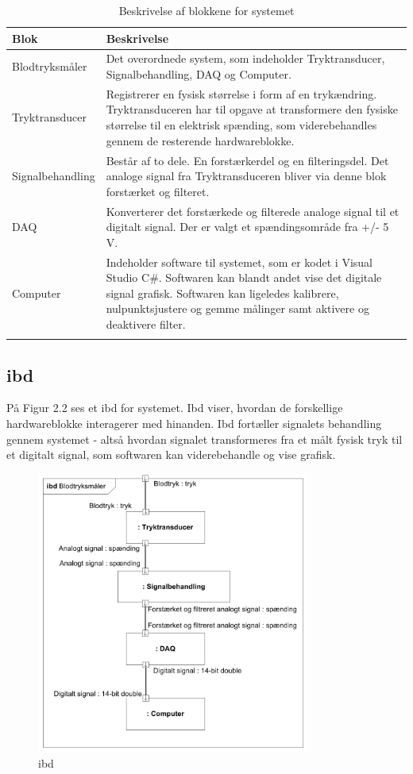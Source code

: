 \begin{longtabu} to 
	\textbf{Blok} &	\textbf{Beskrivelse} \\[-1ex]
	\midrule
	Blodtryksmåler & Det overordnede system, som indeholder Tryktransducer, Signalbehandling, DAQ og Computer.\\[-1ex]
	Tryktransducer & Registrerer en fysisk størrelse i form af en trykændring. Tryktransduceren har til opgave at transformere den fysiske størrelse til en elektrisk spænding, som viderebehandles gennem de resterende hardwareblokke.  \\[-1ex]
	Signalbehandling & Består af to dele. En forstærkerdel og en filteringsdel. Det analoge signal fra Tryktransduceren bliver via denne blok forstærket og filteret.\\[-1ex]
	DAQ & Konverterer det forstærkede og filterede analoge signal til et digitalt signal. Der er valgt et spændingsområde fra +/- 5 V.\\[-1ex]
	Computer & Indeholder software til systemet, som er kodet i Visual Studio C\#. Softwaren kan blandt andet vise det digitale signal grafisk. Softwaren kan ligeledes kalibrere, nulpunktsjustere og gemme målinger samt aktivere og deaktivere filter.\\[-1ex]
	\caption{Beskrivelse af blokkene for systemet}
	\end{longtabu}
	
\subsection{ibd}
På Figur 2.2 ses et ibd for systemet. Ibd viser, hvordan de forskellige hardwareblokke interagerer med hinanden. Ibd fortæller signalets behandling gennem systemet - altså hvordan signalet transformeres fra et målt fysisk tryk til et digitalt signal, som softwaren kan viderebehandle og vise grafisk. 

\begin{figure}[H]
	\centering
	\includegraphics[width=0.8\textwidth]{Figurer/Snip20151209_72}
	\caption{ibd}
	\label{fig:ibd}
\end{figure}

